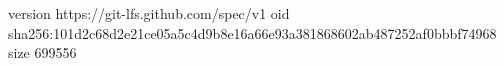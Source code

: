 version https://git-lfs.github.com/spec/v1
oid sha256:101d2c68d2e21ce05a5c4d9b8e16a66e93a381868602ab487252af0bbbf74968
size 699556
